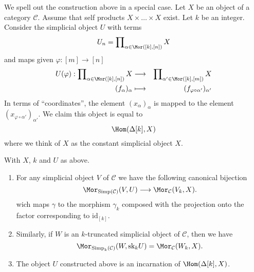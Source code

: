 \noindent
We spell out the construction above in a special case.
Let $X$ be an object of a category $\mathcal{C}$.
Assume that self products $X \times \ldots \times X$ exist.
Let $k$ be an integer.
Consider the simplicial object $U$ with terms
$$
U_n = \prod\nolimits_{\alpha \in \Mor([k], [n])} X
$$
and maps given $\varphi : [m] \to [n]$
\begin{eqnarray*}
U(\varphi) :
\prod\nolimits_{\alpha \in \Mor([k], [n])} X
& \longrightarrow &
\prod\nolimits_{\alpha' \in \Mor([k], [m])} X \\
(f_{\alpha})_{\alpha} & \longmapsto &
(f_{\varphi \circ \alpha'})_{\alpha'}
\end{eqnarray*}
In terms of ``coordinates'', the element $(x_\alpha)_\alpha$
is mapped to the element $(x_{\varphi \circ \alpha'})_{\alpha'}$.
We claim this object is equal to
$$
\Hom(\Delta[k], X)
$$
where we think of $X$ as the constant simplicial object $X$.

\begin{lemma}
\label{lemma-morphism-into-product}
With $X$, $k$ and $U$ as above.
\begin{enumerate}
\item For any simplicial object $V$ of
$\mathcal{C}$ we have the following
canonical bijection
$$
\Mor_{\text{Simp}(\mathcal{C})}(V, U)
\longrightarrow
\Mor_\mathcal{C}(V_k, X).
$$
wich maps $\gamma$ to the morphism $\gamma_k$ composed with
the projection onto the factor corresponding to $\text{id}_{[k]}$.
\item Similarly, if $W$ is an $k$-truncated simplicial object
of $\mathcal{C}$, then we have
$$
\Mor_{\text{Simp}_k(\mathcal{C})}(W, \text{sk}_k U)
=
\Mor_\mathcal{C}(W_k, X).
$$
\item The object $U$ constructed above is an
incarnation of $\Hom(\Delta[k], X)$.
\end{enumerate}
\end{lemma}

